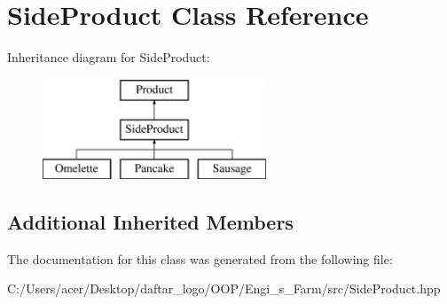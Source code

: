 \hypertarget{class_side_product}{}\section{Side\+Product Class Reference}
\label{class_side_product}
Inheritance diagram for Side\+Product\+:\begin{figure}[H]
\begin{center}
\leavevmode
\includegraphics[height=3.000000cm]{class_side_product}
\end{center}
\end{figure}
\subsection*{Additional Inherited Members}


The documentation for this class was generated from the following file\+:\begin{DoxyCompactItemize}
\item 
C\+:/\+Users/acer/\+Desktop/daftar\+\_\+logo/\+O\+O\+P/\+Engi\+\_\+s\+\_\+\+Farm/src/Side\+Product.\+hpp\end{DoxyCompactItemize}
